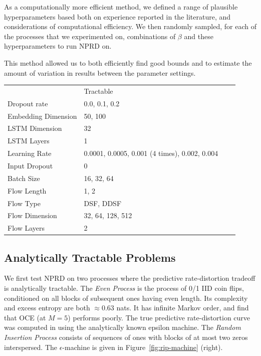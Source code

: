 \documentclass[11pt,letterpaper]{article}
\begin{document}
As a computationally more efficient method, we defined a range of plausible hyperparameters based both on experience reported in the literature, and considerations of computational efficiency.
We then randomly sampled, for each of the processes that we experimented on, combinations of $\beta$ and these hyperparameters to run NPRD on.

This method allowed us to both efficiently find good bounds and to estimate the amount of variation in results between the parameter settings.

\begin{tabular}{llll}
	            & Tractable \\
	Dropout rate & 0.0, 0.1, 0.2 \\
	Embedding Dimension & 50, 100 \\
	LSTM Dimension & 32 \\
	LSTM Layers & 1 \\
	Learning Rate & 0.0001, 0.0005, 0.001 (4 times), 0.002, 0.004 \\
	Input Dropout & 0 \\
	Batch Size & 16, 32, 64 \\
	Flow Length & 1, 2 \\
	Flow Type & DSF, DDSF \\
	Flow Dimension & 32, 64, 128, 512 \\
	Flow Layers & 2 \\
\end{tabular}



\subsection{Analytically Tractable Problems}

We first test NPRD on two processes where the predictive rate-distortion tradeoff is analytically tractable. %
The \emph{Even Process} \citep{marzen-predictive-2016} is the process of 0/1 IID coin flips, conditioned on all blocks of subsequent ones having even length.
Its complexity and excess entropy are both $\approx 0.63$ nats. %
It has infinite Markov order, and \cite{marzen-predictive-2016} find that OCE (at $M=5$) performs poorly. %
The true predictive rate-distortion curve was computed in \cite{marzen-predictive-2016} using the analytically known epsilon machine.
The \emph{Random Insertion Process} \citep{marzen-predictive-2016} consists of sequences of ones with blocks of at most two zeros interspersed.
The $\epsilon$-machine is given in Figure~\ref{fig:rip-machine} (right).
\end{document}
